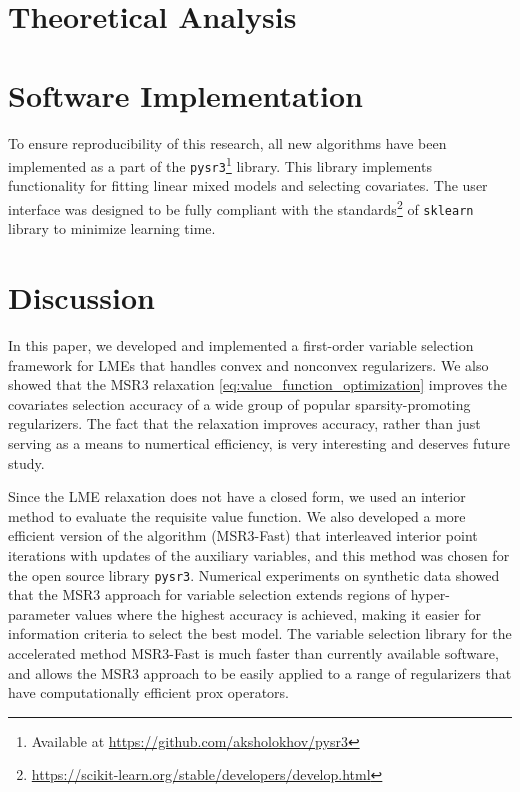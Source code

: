 \section{Theoretical Analysis}


\section{Software Implementation}
To ensure reproducibility of this research, all new algorithms have been implemented as a part of the \texttt{pysr3}\footnote{Available at \href{https://github.com/aksholokhov/pysr3}{https://github.com/aksholokhov/pysr3}} library. This library implements functionality for fitting linear mixed models and selecting covariates. The user interface was designed to be fully compliant with the standards\footnote{\href{https://scikit-learn.org/stable/developers/develop.html}{https://scikit-learn.org/stable/developers/develop.html}} of \texttt{sklearn} library to minimize learning time. 

    





\section{Discussion}
\label{sec:discussion}

    In this paper, we developed and implemented a first-order variable selection framework for LMEs that handles convex and nonconvex regularizers. We also showed that 
    the MSR3 relaxation \eqref{eq:value_function_optimization} 
improves the covariates selection accuracy of a wide group of popular sparsity-promoting regularizers. The fact that the relaxation improves accuracy, rather than just serving as a means to {numertical efficiency, %
     is very interesting and deserves future study.} %
    
    Since the LME relaxation does not have a closed form, we used an interior method to evaluate the requisite value function. We also developed 
    a more efficient version of the algorithm  (MSR3-Fast) that interleaved interior point iterations with updates of the auxiliary variables, and this method was chosen for the 
    open source library \texttt{pysr3}. %
{ Numerical experiments on synthetic data showed that the MSR3 approach for variable selection extends regions of hyper-parameter values where the highest accuracy is achieved, making it easier for information criteria to select the best model.} 
 The variable selection library for the accelerated method MSR3-Fast is much faster than currently available software, and allows the MSR3 approach to be easily applied to a range of regularizers that have 
{computationally efficient prox operators.} %

